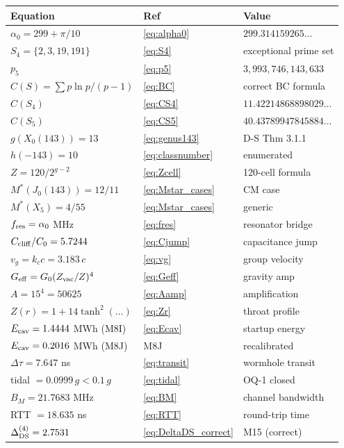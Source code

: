 \documentclass[12pt,letterpaper]{article}
\begin{document}
\begin{center}
\begin{longtable}{lll}
\toprule
Equation & Ref & Value \\
\midrule
$\alpha_0 = 299 + \pi/10$ & \eqref{eq:alpha0} & $299.314159265\ldots$ \\
$S_4 = \{2,3,19,191\}$ & \eqref{eq:S4} & exceptional prime set \\
$p_5$ & \eqref{eq:p5} & $3{,}993{,}746{,}143{,}633$ \\
$C(S) = \sum p\ln p/(p-1)$ & \eqref{eq:BC} & correct BC formula \\
$C(S_4)$ & \eqref{eq:CS4} & $11.42214868898029\ldots$ \\
$C(S_5)$ & \eqref{eq:CS5} & $40.43789947845884\ldots$ \\
$g(X_0(143)) = 13$ & \eqref{eq:genus143} & D-S Thm 3.1.1 \\
$h(-143) = 10$ & \eqref{eq:classnumber} & enumerated \\
$Z = 120/2^{g-2}$ & \eqref{eq:Zcell} & 120-cell formula \\
$M^*(J_0(143)) = 12/11$ & \eqref{eq:Mstar_cases} & CM case \\
$M^*(X_5) = 4/55$ & \eqref{eq:Mstar_cases} & generic \\
$f_{\rm res} = \alpha_0$ MHz & \eqref{eq:fres} & resonator bridge \\
$C_{\rm cliff}/C_0 = 5.7244$ & \eqref{eq:Cjump} & capacitance jump \\
$v_g = k_c c = 3.183\,c$ & \eqref{eq:vg} & group velocity \\
$G_{\rm eff} = G_0(Z_{\rm vac}/Z)^4$ & \eqref{eq:Geff} & gravity amp \\
$A = 15^4 = 50625$ & \eqref{eq:Aamp} & amplification \\
$Z(r) = 1+14\tanh^2(\ldots)$ & \eqref{eq:Zr} & throat profile \\
$E_{\rm cav} = 1.4444$ MWh (M8I) & \eqref{eq:Ecav} & startup energy \\
$E_{\rm cav} = 0.2016$ MWh (M8J) & M8J & recalibrated \\
$\Delta\tau = 7.647$ ns & \eqref{eq:transit} & wormhole transit \\
tidal $= 0.0999\,g < 0.1\,g$ & \eqref{eq:tidal} & OQ-1 closed \\
$B_M = 21.7683$ MHz & \eqref{eq:BM} & channel bandwidth \\
RTT $= 18.635$ ns & \eqref{eq:RTT} & round-trip time \\
$\Delta_{\rm DS}^{(4)} = 2.7531$ & \eqref{eq:DeltaDS_correct} & M15 (correct) \\

\end{longtable}
\end{center}
\end{document}
